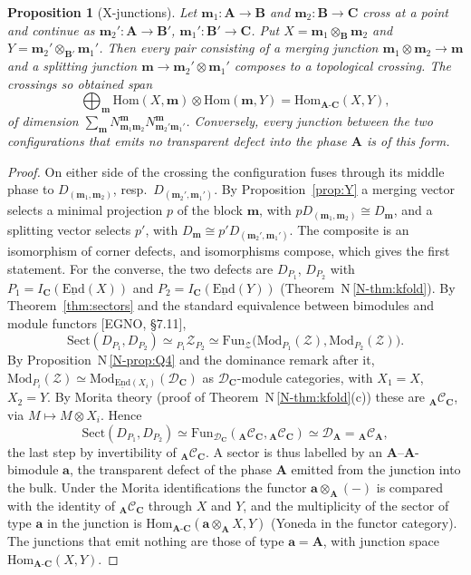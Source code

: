 \documentclass[11pt]{article}
\newtheorem{proposition}[theorem]{Proposition}
\theoremstyle{definition}
\theoremstyle{remark}
\newcommand{\bfB}{\mathbf B}
\newcommand{\bfA}{\mathbf A}
\newcommand{\bfC}{\mathbf C}
\newcommand{\nref}[1]{N\,\ref{N-#1}}
\begin{document}
\begin{proposition}[X-junctions]\label{prop:X}
Let $\mathbf m_1\colon\bfA\to\bfB$ and $\mathbf m_2\colon\bfB\to\bfC$ cross at a point and continue as $\mathbf m_2'\colon\bfA\to\bfB'$, $\mathbf m_1'\colon\bfB'\to\bfC$. Put $X=\mathbf m_1\otimes_{\bfB}\mathbf m_2$ and $Y=\mathbf m_2'\otimes_{\bfB'}\mathbf m_1'$. Then every pair consisting of a merging junction $\mathbf m_1\otimes\mathbf m_2\to\mathbf m$ and a splitting junction $\mathbf m\to\mathbf m_2'\otimes\mathbf m_1'$ composes to a topological crossing. The crossings so obtained span
\[
\bigoplus_{\mathbf m}\mathrm{Hom}(X,\mathbf m)\otimes\mathrm{Hom}(\mathbf m,Y)=\mathrm{Hom}_{\bfA\text{-}\bfC}(X,Y),
\]
of dimension $\sum_{\mathbf m}N^{\mathbf m}_{\mathbf m_1\mathbf m_2}N^{\mathbf m}_{\mathbf m_2'\mathbf m_1'}$. Conversely, every junction between the two configurations that emits no transparent defect into the phase $\bfA$ is of this form.
\end{proposition}
\begin{proof}
On either side of the crossing the configuration fuses through its middle phase to $D_{(\mathbf m_1,\mathbf m_2)}$, resp.\ $D_{(\mathbf m_2',\mathbf m_1')}$. By Proposition~\ref{prop:Y} a merging vector selects a minimal projection $p$ of the block $\mathbf m$, with $pD_{(\mathbf m_1,\mathbf m_2)}\cong D_{\mathbf m}$, and a splitting vector selects $p'$, with $D_{\mathbf m}\cong p'D_{(\mathbf m_2',\mathbf m_1')}$. The composite is an isomorphism of corner defects, and isomorphisms compose, which gives the first statement. For the converse, the two defects are $D_{P_1}$, $D_{P_2}$ with $P_1=I_{\bfC}(\underline{\mathrm{End}}(X))$ and $P_2=I_{\bfC}(\underline{\mathrm{End}}(Y))$ (Theorem~\nref{thm:kfold}). By Theorem~\ref{thm:sectors} and the standard equivalence between bimodules and module functors [EGNO, \S7.11],
\[
\mathrm{Sect}(D_{P_1},D_{P_2})\simeq{}_{P_1}\mathcal Z_{P_2}\simeq\mathrm{Fun}_{\mathcal Z}\big(\mathrm{Mod}_{P_1}(\mathcal Z),\mathrm{Mod}_{P_2}(\mathcal Z)\big).
\]
By Proposition~\nref{prop:Q4} and the dominance remark after it, $\mathrm{Mod}_{P_i}(\mathcal Z)\simeq\mathrm{Mod}_{\underline{\mathrm{End}}(X_i)}(\mathcal D_{\bfC})$ as $\mathcal D_{\bfC}$-module categories, with $X_1=X$, $X_2=Y$. By Morita theory (proof of Theorem~\nref{thm:kfold}(c)) these are ${}_{\bfA}\mathcal C_{\bfC}$, via $M\mapsto M\otimes X_i$. Hence
\[
\mathrm{Sect}(D_{P_1},D_{P_2})\simeq\mathrm{Fun}_{\mathcal D_{\bfC}}({}_{\bfA}\mathcal C_{\bfC},{}_{\bfA}\mathcal C_{\bfC})\simeq\mathcal D_{\bfA}={}_{\bfA}\mathcal C_{\bfA},
\]
the last step by invertibility of ${}_{\bfA}\mathcal C_{\bfC}$. A sector is thus labelled by an $\bfA$--$\bfA$-bimodule $\mathbf a$, the transparent defect of the phase $\bfA$ emitted from the junction into the bulk. Under the Morita identifications the functor $\mathbf a\otimes_{\bfA}(-)$ is compared with the identity of ${}_{\bfA}\mathcal C_{\bfC}$ through $X$ and $Y$, and the multiplicity of the sector of type $\mathbf a$ in the junction is $\mathrm{Hom}_{\bfA\text{-}\bfC}(\mathbf a\otimes_{\bfA}X,Y)$ (Yoneda in the functor category). The junctions that emit nothing are those of type $\mathbf a=\bfA$, with junction space $\mathrm{Hom}_{\bfA\text{-}\bfC}(X,Y)$.
\end{proof}
\end{document}
